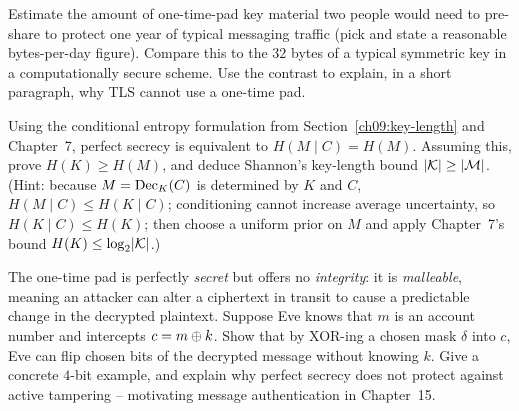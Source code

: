 \begin{exercise}
\label{ch09:ex-presharing}
Estimate the amount of one-time-pad key material two people would need to pre-share to protect one year of typical messaging traffic (pick and state a reasonable bytes-per-day figure). Compare this to the $32$ bytes of a typical symmetric key in a computationally secure scheme. Use the contrast to explain, in a short paragraph, why TLS cannot use a one-time pad.
\end{exercise}

\begin{exercise}
\label{ch09:ex-entropy}
Using the conditional entropy formulation from Section~\ref{ch09:key-length} and Chapter~7, perfect secrecy is equivalent to $H(M \mid C) = H(M)$. Assuming this, prove $H(K) \ge H(M)$, and deduce Shannon's key-length bound $\lvert\mathcal{K}\rvert \ge \lvert\mathcal{M}\rvert$. (Hint: because $M = \operatorname{Dec}_K(C)$ is determined by $K$ and $C$, $H(M \mid C) \le H(K \mid C)$; conditioning cannot increase average uncertainty, so $H(K \mid C) \le H(K)$; then choose a uniform prior on $M$ and apply Chapter~7's bound $H(K) \le \log_2 \lvert\mathcal{K}\rvert$.)
\end{exercise}

\begin{exercise}
\label{ch09:ex-malleable}
The one-time pad is perfectly \emph{secret} but offers no \emph{integrity}: it is \emph{malleable}, meaning an attacker can alter a ciphertext in transit to cause a predictable change in the decrypted plaintext. Suppose Eve knows that $m$ is an account number and intercepts $c = m \oplus k$. Show that by XOR-ing a chosen mask $\delta$ into $c$, Eve can flip chosen bits of the decrypted message without knowing $k$. Give a concrete $4$-bit example, and explain why perfect secrecy does not protect against active tampering -- motivating message authentication in Chapter~15.
\end{exercise}
